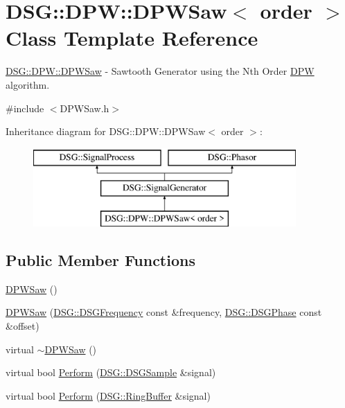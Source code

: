 \hypertarget{class_d_s_g_1_1_d_p_w_1_1_d_p_w_saw}{\section{D\+S\+G\+:\+:D\+P\+W\+:\+:D\+P\+W\+Saw$<$ order $>$ Class Template Reference}
\label{class_d_s_g_1_1_d_p_w_1_1_d_p_w_saw}
}


\hyperlink{class_d_s_g_1_1_d_p_w_1_1_d_p_w_saw}{D\+S\+G\+::\+D\+P\+W\+::\+D\+P\+W\+Saw} -\/ Sawtooth Generator using the Nth Order \hyperlink{namespace_d_s_g_1_1_d_p_w}{D\+P\+W} algorithm.  




{\ttfamily \#include $<$D\+P\+W\+Saw.\+h$>$}

Inheritance diagram for D\+S\+G\+:\+:D\+P\+W\+:\+:D\+P\+W\+Saw$<$ order $>$\+:\begin{figure}[H]
\begin{center}
\leavevmode
\includegraphics[height=3.000000cm]{class_d_s_g_1_1_d_p_w_1_1_d_p_w_saw}
\end{center}
\end{figure}
\subsection*{Public Member Functions}
\begin{DoxyCompactItemize}
\item 
\hyperlink{class_d_s_g_1_1_d_p_w_1_1_d_p_w_saw_ae9409342bec9d28c6e3e5235619f0c17}{D\+P\+W\+Saw} ()
\item 
\hyperlink{class_d_s_g_1_1_d_p_w_1_1_d_p_w_saw_a750142d70e22ccfb961edc73b13386f6}{D\+P\+W\+Saw} (\hyperlink{namespace_d_s_g_a4315a061386fa1014fda09b15d3a6973}{D\+S\+G\+::\+D\+S\+G\+Frequency} const \&frequency, \hyperlink{namespace_d_s_g_a44431ce1eb0a7300efdd207bc879e52c}{D\+S\+G\+::\+D\+S\+G\+Phase} const \&offset)
\item 
virtual \hyperlink{class_d_s_g_1_1_d_p_w_1_1_d_p_w_saw_afc78ee5a1353dec65adf963a677e95fe}{$\sim$\+D\+P\+W\+Saw} ()
\item 
virtual bool \hyperlink{class_d_s_g_1_1_d_p_w_1_1_d_p_w_saw_a8d0bffad58e9bce19fe737302de749ed}{Perform} (\hyperlink{namespace_d_s_g_ac39a94cd27ebcd9c1e7502d0c624894a}{D\+S\+G\+::\+D\+S\+G\+Sample} \&signal)
\item 
virtual bool \hyperlink{class_d_s_g_1_1_d_p_w_1_1_d_p_w_saw_a03548019c5ec057f5980a4bd99a0d3f0}{Perform} (\hyperlink{class_d_s_g_1_1_ring_buffer}{D\+S\+G\+::\+Ring\+Buffer} \&signal)
\end{DoxyCompactItemize}
